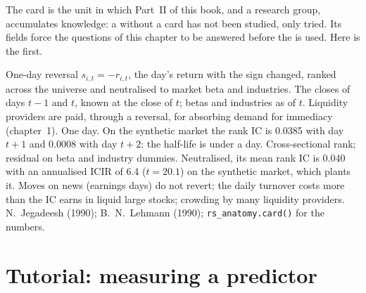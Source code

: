 The card is the unit in which Part~II of this book, and a research group, accumulates knowledge: a  without a card has
not been studied, only tried. Its fields force the questions of this chapter to be answered before the  is used. Here is
the first.

\begin{predictorcard}{One-day reversal}\label{pred:rs:anatomy-of-a-predictor:reversal}
 $s_{i,t} = -r_{i,t}$, the day's return with the sign changed, ranked across the universe and neutralised to
market beta and industries.
 The closes of days $t-1$ and $t$, known at the close of $t$; betas and industries as of $t$.
 Liquidity providers are paid, through a reversal, for absorbing demand for immediacy (chapter~1).
 One day. On the synthetic market the rank IC is 0.0385 with day $t+1$ and 0.0008 with day $t+2$:
the half-life is under a day.
 Cross-sectional rank; residual on beta and industry dummies. Neutralised, its mean rank IC is 0.040 with an
annualised ICIR of 6.4 ($t = 20.1$) on the synthetic market, which plants it.
 Moves on news (earnings days) do not revert; the daily turnover costs more than the IC earns in liquid
large stocks; crowding by many liquidity providers.
 N.~Jegadeesh (1990); B.~N.~Lehmann (1990); \texttt{rs\_anatomy.card()} for the numbers.
\end{predictorcard}

\section{Tutorial: measuring a predictor}\label{tut:rs:anatomy-of-a-predictor:measure}

